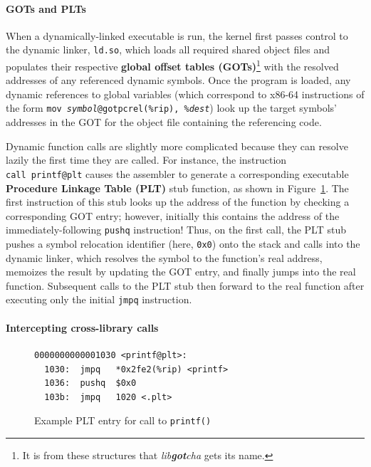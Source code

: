 \paragraph{GOTs and PLTs}

When a dynamically-linked executable is run, the kernel first passes control to the
dynamic linker, \texttt{ld.so}, which loads all required shared object files and
populates their respective \textbf{global offset tables (GOTs)}\footnote{It is from
these structures that \textit{lib\textbf{got}cha} gets its name.} with the resolved
addresses of any referenced dynamic symbols.  Once the program is loaded, any
dynamic references to global variables (which correspond to x86-64 instructions of
the form \texttt{mov~\textit{symbol}@gotpcrel(\%rip),~\%\textit{dest}}) look up the
target symbols' addresses in the GOT for the object file containing the referencing
code.

Dynamic function calls are slightly more complicated because they can resolve lazily
the first time they are called.  For instance, the instruction
\texttt{call~printf@plt} causes the assembler to generate a corresponding executable
\textbf{Procedure Linkage Table (PLT)} stub function, as shown in
Figure~\ref{fig:plt}.  The first instruction of this stub looks up the address of the
function by checking a corresponding GOT entry; however, initially this contains the
address of the immediately-following \texttt{pushq} instruction!  Thus, on the first
call, the PLT stub pushes a symbol relocation identifier (here, \texttt{0x0}) onto
the stack and calls into the dynamic linker, which resolves the symbol to the
function's real address, memoizes the result by updating the GOT entry, and finally
jumps into the real function.  Subsequent calls to the PLT stub then forward to the
real function after executing only the initial \texttt{jmpq} instruction.

\paragraph{Intercepting cross-library calls}


\begin{figure}
\begin{verbatim}
0000000000001030 <printf@plt>:
  1030:  jmpq   *0x2fe2(%rip) <printf>
  1036:  pushq  $0x0
  103b:  jmpq   1020 <.plt>
\end{verbatim}
\caption{Example PLT entry for call to \texttt{printf()}}
\label{fig:plt}
\end{figure}

